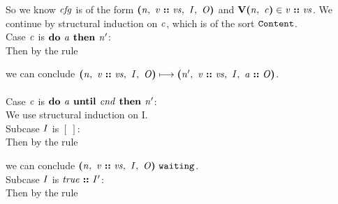 \documentclass[12pt]{article}
\begin{document}
So we know $\nterm{cfg}$ is of the form
$\cfg{\nterm{n}}{\cons{\nterm{v}}{\nterm{vs}}}{\nterm{I}}{\nterm{O}}$ and
$\ver{\nterm{n}}{\nterm{c}} \in \cons{\nterm{v}}{\nterm{vs}}$. We continue by
  structural induction on $\nterm{c}$, which is of the sort $\sort{Content}$.\\

Case $\nterm{c}$ is $\doonce{\nterm{a}}{\nterm{n'}}$:\\

Then by the rule

\begin{mathpar}
\end{mathpar}

we can conclude
$\steps{
   \cfg{\nterm{n}}{\cons{\nterm{v}}{\nterm{vs}}}{\nterm{I}}{\nterm{O}}
 }{
   \cfg{\nterm{n'}}{\cons{\nterm{v}}{\nterm{vs}}}{\nterm{I}}{\cons{\nterm{a}}{\nterm{O}}}
 }$.\\
\\

Case $\nterm{c}$ is $\dountil{\nterm{a}}{\nterm{cnd}}{\nterm{n'}}$:\\

We use structural induction on I.\\

Subcase $\nterm{I}$ is $[\ ]$:\\

Then by the rule

\begin{mathpar}
\end{mathpar}

we can conclude
$\waiting{\cfg{\nterm{n}}{\cons{\nterm{v}}{\nterm{vs}}}{\nterm{I}}{\nterm{O}}}$.\\

Subcase $\nterm{I}$ is $\cons{\nterm{true}}{\nterm{I'}}$:\\

Then by the rule

\begin{mathpar}
\end{mathpar}
\end{document}
